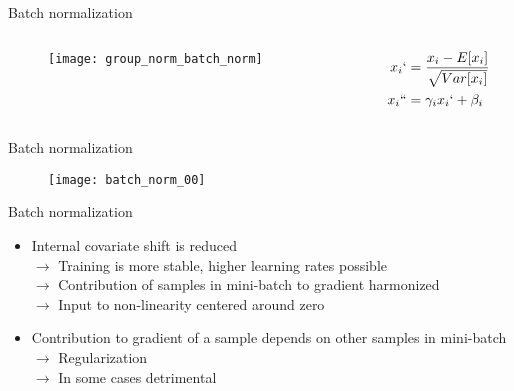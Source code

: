 \begin{frame}{Batch normalization}
  \begin{columns}
    \begin{column}{0.45\textwidth}
      \begin{figure}
        \texttt{[image: group\_norm\_batch\_norm]}
      \end{figure}
    \end{column}
    \begin{column}{0.45\textwidth}
      \begin{align*}
        x_{i}` &= \frac{x_{i} - E[x_{i}]}{\sqrt{Var[x_{i}]}} \\
        x_{i}`` & = \gamma_{i} x_{i}` + \beta_{i}
      \end{align*}
    \end{column}
  \end{columns}
\end{frame}


\begin{frame}{Batch normalization}
  \begin{figure}
    \texttt{[image: batch\_norm\_00]}
  \end{figure}
\end{frame}


\begin{frame}{Batch normalization}
  \begin{itemize}
    \item Internal covariate shift is reduced \\
          $\rightarrow$ Training is more stable, higher learning rates possible \\
          $\rightarrow$ Contribution of samples in mini-batch to gradient harmonized \\
          $\rightarrow$ Input to non-linearity centered around zero
    \item Contribution to gradient of a sample depends on other samples in mini-batch \\
          $\rightarrow$ Regularization \\
          $\rightarrow$ In some cases detrimental
  \end{itemize}
  \note{
    \begin{itemize}
      \item
      \item
    \end{itemize}
  }
\end{frame}



